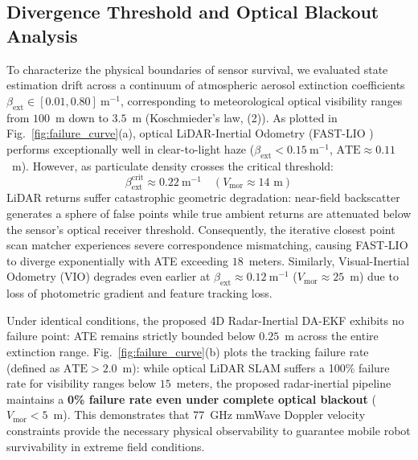 \documentclass[lettersize,journal]{IEEEtran}
\begin{document}
\subsection{Divergence Threshold and Optical Blackout Analysis}
To characterize the physical boundaries of sensor survival, we evaluated state estimation drift across a continuum of atmospheric aerosol extinction coefficients $\beta_{\mathrm{ext}} \in [0.01, 0.80]~\mathrm{m}^{-1}$, corresponding to meteorological optical visibility ranges from $100$~m down to $3.5$~m (Koschmieder's law, (2)). 
As plotted in Fig.~\ref{fig:failure_curve}(a), optical LiDAR-Inertial Odometry (FAST-LIO \cite{xu2021fast}) performs exceptionally well in clear-to-light haze ($\beta_{\mathrm{ext}} < 0.15~\mathrm{m}^{-1}$, $\mathrm{ATE} \approx 0.11$~m). 
However, as particulate density crosses the critical threshold:
\begin{equation}
\beta_{\mathrm{ext}}^{\mathrm{crit}} \approx 0.22~\mathrm{m}^{-1} \quad (V_{\mathrm{mor}} \approx 14\text{ m})
\end{equation}
LiDAR returns suffer catastrophic geometric degradation: near-field backscatter generates a sphere of false points while true ambient returns are attenuated below the sensor's optical receiver threshold. 
Consequently, the iterative closest point scan matcher experiences severe correspondence mismatching, causing FAST-LIO to diverge exponentially with ATE exceeding $18$~meters. 
Similarly, Visual-Inertial Odometry (VIO) degrades even earlier at $\beta_{\mathrm{ext}} \approx 0.12~\mathrm{m}^{-1}$ ($V_{\mathrm{mor}} \approx 25$~m) due to loss of photometric gradient and feature tracking loss.

Under identical conditions, the proposed 4D Radar-Inertial DA-EKF exhibits no failure point: ATE remains strictly bounded below $0.25$~m across the entire extinction range. 
Fig.~\ref{fig:failure_curve}(b) plots the tracking failure rate (defined as $\mathrm{ATE} > 2.0$~m): while optical LiDAR SLAM suffers a 100\% failure rate for visibility ranges below $15$~meters, the proposed radar-inertial pipeline maintains a \textbf{0\% failure rate even under complete optical blackout} ($V_{\mathrm{mor}} < 5$~m). 
This demonstrates that 77~GHz mmWave Doppler velocity constraints provide the necessary physical observability to guarantee mobile robot survivability in extreme field conditions.
\end{document}
